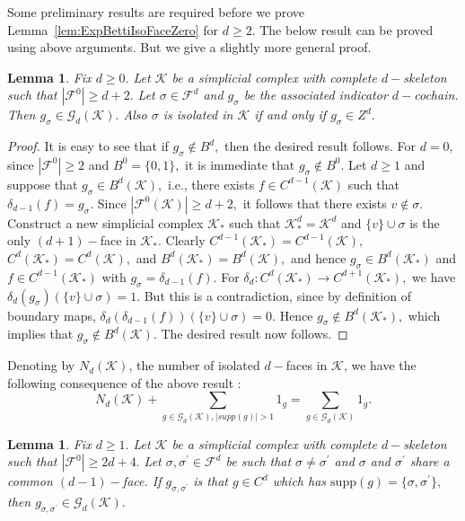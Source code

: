 \documentclass[12pt]{amsart}
\newtheorem{lemma}[theorem]{Lemma}
\numberwithin{equation}{section}
\numberwithin{theorem}{section}
\newcommand{\1}{\mathbf{1}}
\def\F{\mathcal{F}}
\def\K{\mathcal{K}}
\def\G{\mathcal{G}}
\def\supp{\mathrm{supp}}
\begin{document}
Some preliminary results are required before we prove Lemma~\ref{lem:ExpBettiIsoFaceZero} for $d \geq 2.$ The below result can be proved using above arguments. But we give a slightly more general proof.
%
\begin{lemma}
Fix $d \geq 0.$ Let $\K$ be a simplicial complex with complete $d-$skeleton such that $|\F^0| \geq d+ 2.$ Let $\sigma \in \F^d$ and $g_{\sigma}$ be the associated indicator $d-$cochain. Then $g_{\sigma} \in \G_{d}(\K).$ Also $\sigma$ is isolated in $\K$ if and only if $g_{\sigma} \in Z^d.$
\end{lemma}
\begin{proof}
It is easy to see that if $g_\sigma \notin B^d,$ then the desired result follows. For $d = 0,$ since $|\F^0| \geq 2$ and $B^0 = \{0, 1\},$ it is immediate that $g_{\sigma} \notin B^0.$ Let $d \geq 1$ and suppose that $g_{\sigma} \in B^d(\K),$ i.e., there exists $f \in C^{d - 1}(\K)$ such that $\delta_{d - 1}(f) = g_{\sigma}.$ Since $|\F^0(\K)| \geq d + 2,$ it follows that there exists $v \notin \sigma.$ Construct a new simplicial complex $\K_*$ such that $\K_*^d = \K^d$ and $\{v\} \cup \sigma$ is the only $(d + 1)-$face in $\K_*.$ Clearly $C^{d - 1}(\K_*) = C^{d - 1}(\K),$ $C^d(\K_*) = C^d(\K),$ and $B^d(\K_*) = B^d(\K),$  and hence $g_{\sigma} \in B^d(\K_*)$ and $f \in C^{d - 1}(\K_*)$ with $g_{\sigma} = \delta_{d - 1}(f).$ For $\delta_d : C^d(\K_*) \to C^{d + 1}(\K_*),$ we have $\delta_d(g_{\sigma})( \{v\} \cup \sigma) = 1.$ But this is a contradiction, since by definition of boundary maps, $\delta_d(\delta_{d - 1}(f))(\{v\} \cup \sigma) = 0.$ Hence $g_{\sigma} \notin B^d(\K_*),$ which implies that $g_{\sigma} \notin B^d(\K).$ The desired result now follows.
\end{proof}
%

Denoting by $N_{d}(\K)$, the number of isolated $d-$faces in $\K$, we have the following consequence of the above result :
%
\begin{equation}
\label{eqn:Upp_Bd_Isol_Faces}
N_{d}(\K) + \sum_{g \in \G_{d}(\K), |supp(g)| >1} 1_{g} = \sum_{g \in \G_{d}(\K)} 1_{g}.
\end{equation}
%
%
\begin{lemma}
\label{lem:Support_2_cochain}
Fix $d \geq 1.$ Let $\K$ be a simplicial complex with complete $d-$skeleton such that $|\F^0| \geq 2d + 4.$ Let $\sigma, \sigma^\prime \in \F^d$ be such that $\sigma \neq \sigma^\prime$ and $\sigma$ and $\sigma^\prime$ share a common $(d - 1)-$face. If $g_{\sigma, \sigma^\prime}$ is that $g \in C^d$ which has $\supp(g) = \{\sigma, \sigma^\prime\},$ then $g_{\sigma, \sigma^\prime} \in \G_{d}(\K).$
\end{lemma}
%
\end{document}
